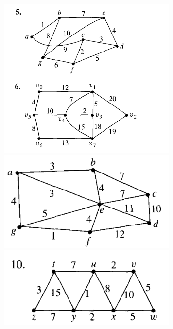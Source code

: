 \documentclass{article}
\begin{document}
\begin{figure}[h]
\centering
\includegraphics[width=90mm]{1}
\includegraphics[width=90mm]{3}
\includegraphics[width=90mm]{4}
\end{figure}
\end{document}
